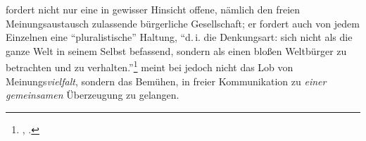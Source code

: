  fordert nicht nur eine in gewisser Hinsicht offene,
nämlich den freien Meinungsaustausch zulassende bürgerliche Gesellschaft; er
fordert auch von jedem Einzelnen eine \enquote{pluralistische} Haltung,
\enquote{d.\,i. die Denkungsart: sich nicht als die ganze Welt in seinem Selbst
befassend, sondern als einen bloßen Weltbürger zu betrachten und zu
verhalten.}\footnote{\cite[BA 8]{Kant:AnthropologieinpragmatischerHinsicht1977},
\cite[VII: 130.12--14]{Kant:GesammelteWerke1900ff.}.} 
meint bei  jedoch nicht das Lob von
Meinungs\emph{vielfalt}, sondern das Bemühen, in freier Kommunikation zu
\emph{einer gemeinsamen} Überzeugung zu gelangen.
\begin{comment}
Unser \distanz{moderner} Pluralismus mit seiner Forderung nach
Toleranz\footnote{\name[Immanuel]{Kant} nennt den Namen der Toleranz
\enquote{hochmütig}
\mkbibparens{\cite[][A 491]{Kant:BeantwortungderFrage:WasistAufklaerung?1977},
\cite[][VIII: 40.30]{Kant:GesammelteWerke1900ff.}}. Siehe dazu
\cite{Weidemann:VonenquotebisweilenunvermeidlicherGeringschaetzung2010}.} und
Offenheit gründet in der Annahme, dass entsprechende Urteile -- bezüglich des
\distanz{richtigen} Lebensstils, der Religion etc.\ -- keine epistemisch
fundierte Antwort erlauben, sei es, weil sie nicht wahrheitsfähig sind
(\enquote{de gustibus non est disputandum}), sei es, weil wir die Wahrheit nicht
ausmachen (Gott nicht erkennen) können. Es gehört zu unserem modernen,
aufgeklärten Selbstverständnis, dass die Wahl des religiösen Bekenntnisses und
die Ansichten über den \distanz{Sinn des Lebens} und die \distanz{Bestimmung des
Menschen} dem subjektiven Belieben anheim gestellt sind. Religiöse Toleranz,
sexuelle Selbstbestimmung und Gleichwertigkeit unterschiedlicher Lebensentwürfe
gehören zu dem, was wir ganz selbstverständlich als Erbe der Aufklärung und
Errungenschaften der Moderne ansehen. Dieser Begriff von Pluralismus gründet in
einer (heute vielleicht dominanten) Konzeption von Autonomie, die diese als
wesentlich individualistisch und egozentrisch begreift. Diese Konzeption trennt
Autonomie und Vernunft, insofern Autonomie darin besteht, unsere je eigenen
Präferenzen zu verfolgen, und der Vernunft die nachrangige Aufgabe zukommt, das
Verfolgen dieser Präferenzen effizient zu gestalten und mit den Präferenzen
anderer zu koordinieren.\footnote{Siehe dazu auch
\cite[][\pno~216\,f.]{ONeill:AufgeklaerteVernunft1996}.} Ein Dialog als
Grundlage unserer Vernunft und vernünftiger Einsichten und Entscheidungen kann
sich in \name[Immanuel]{Kant}s Konzeption hingegen nicht mit dem Anspruch

\end{comment}
